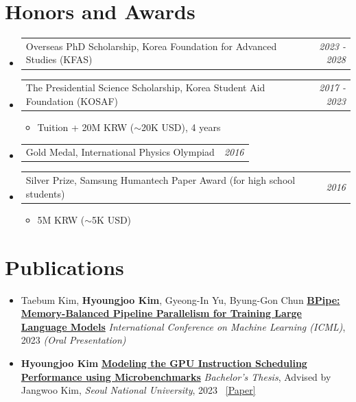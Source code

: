 \documentclass[a4paper]{article}
\makeatletter
\newcommand{\resumeSubheadingSimple}[2]{
  \vspace{-1pt}\item
	\begin{tabular*}{0.97\textwidth}{l@{\extracolsep{\fill}}r}
	  #1 & \textit{#2} \\
	\end{tabular*}
  \vspace{-1pt}
}
\newcommand{\resumeSubheadingVerySimple}[1]{
	\vspace{-1pt}\item #1
	\vspace{-1pt}
}
\newcommand{\resumeSubheadingItem}[1]{
  \vspace{0pt}\item #1
  \vspace{0pt}
}
\newcommand{\resumeSubHeadingListStart}{\begin{itemize}[leftmargin=*]}
\newcommand{\resumeSubHeadingListEnd}{\end{itemize}}
\makeatother
\begin{document}
\section{Honors and Awards}
\resumeSubHeadingListStart
\resumeSubheadingSimple{
	Overseas PhD Scholarship, Korea Foundation for Advanced Studies (KFAS)
}{2023 - 2028}
\resumeSubheadingSimple{
	The Presidential Science Scholarship, Korea Student Aid Foundation (KOSAF)
}{2017 - 2023}
	\resumeSubHeadingListStart
	\resumeSubheadingVerySimple{Tuition + 20M KRW ($\sim$20K USD), 4 years}
	\resumeSubHeadingListEnd
\resumeSubheadingSimple{
	Gold Medal, International Physics Olympiad
}{2016}
\resumeSubheadingSimple{
	Silver Prize, Samsung Humantech Paper Award (for high school students)
}{2016}
	\resumeSubHeadingListStart
	\resumeSubheadingVerySimple{5M KRW ($\sim$5K USD)}
	\resumeSubHeadingListEnd
\resumeSubHeadingListEnd

\section{Publications}
\resumeSubHeadingListStart
	\resumeSubheadingItem{
		Taebum Kim, \textbf{Hyoungjoo Kim}, Gyeong-In Yu, Byung-Gon Chun \newline
		\href{https://openreview.net/forum?id=HVKmLi1iR4}{\textbf{BPipe: Memory-Balanced Pipeline Parallelism for Training Large Language Models}} \newline
		\textit{International Conference on Machine Learning (ICML)}, 2023 \textit{(Oral Presentation)}
	}
	\resumeSubheadingItem{
		\textbf{Hyoungjoo Kim} \newline
		\href{https://snu-primo.hosted.exlibrisgroup.com/permalink/f/1qb4pk8/82SNU_INST21903413170002591}{\textbf{Modeling the GPU Instruction Scheduling Performance using Microbenchmarks}} \newline
		\textit{Bachelor's Thesis}, Advised by Jangwoo Kim, \textit{Seoul National University}, 2023 \  \href{https://github.com/hyoungjook/gpudiag/blob/master/documents/paper.pdf}{[Paper]}
	}

\resumeSubHeadingListEnd
\end{document}
